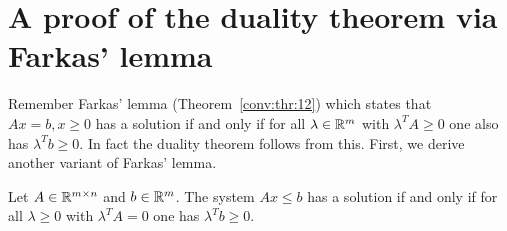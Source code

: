 


\section{A proof of the duality theorem via Farkas' lemma}
\label{sec:proof-dual-theor}

Remember Farkas' lemma (Theorem~\ref{conv:thr:12}) which states that
 $Ax =b, x\geq0$ has a solution if and only if for all $\lambda \in \mathbb{R}^m$
with $\lambda^T A \geq0$ one also has $\lambda^Tb \geq0$. In fact the duality
theorem follows  from this. First,  we derive  another variant of
Farkas' lemma.  

\begin{theorem}
\label{dual:thr:2farkas}
    Let $A \in \mathbb{R}^{m\times n}$ and $b \in \mathbb{R}^m$. The system $Ax\leq b$ has a
    solution if and only if for all $\lambda\geq0$ with $\lambda^TA =0$ one has
    $\lambda^Tb\geq0$. 
\end{theorem}

